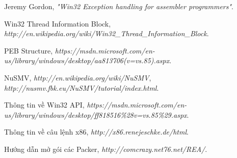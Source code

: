 \begin{thebibliography}{}
\bibitem{}
Jeremy Gordon, \emph{"Win32 Exception handling for assembler programmers"}.	

\bibitem{}
Win32 Thread Information Block, \emph{http://en.wikipedia.org/wiki/Win32\_Thread\_Information\_Block}.

\bibitem{}
PEB Structure, \emph{https://msdn.microsoft.com/en-us/library/windows/desktop/aa813706(v=vs.85).aspx}.

\bibitem{}
NuSMV, \emph{http://en.wikipedia.org/wiki/NuSMV}, \emph{http://nusmv.fbk.eu/NuSMV/tutorial/index.html}.

\bibitem{}
Thông tin về Win32 API, \emph{https://msdn.microsoft.com/en-us/library/windows/desktop/ff818516\%28v=vs.85\%29.aspx}.

\bibitem{}
Thông tin về câu lệnh x86, \emph{http://x86.renejeschke.de/html}.

\bibitem{}
Hướng dẫn mở gói các Packer, \emph{http://comcrazy.net76.net/REA/}.

\end{thebibliography}

